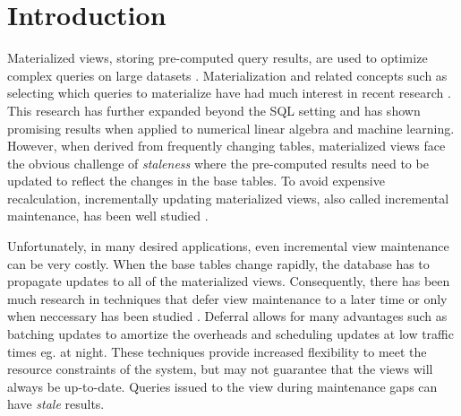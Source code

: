 \section{Introduction}
Materialized views, storing pre-computed query results, are used to optimize complex queries on large datasets \cite{gupta1995maintenance, chirkova2011materialized, halevy2001answering}. 
Materialization and related concepts such as selecting which queries to materialize
have had much interest in recent research \cite{zaharia2012resilient,lefevre2014opportunistic, bailis2014scalable, perez2014history}.
This research has further expanded beyond the SQL setting \cite{nikolic2014linview} and 
has shown promising results when applied to numerical linear algebra and machine learning.
However, when derived from frequently changing tables,
materialized views face the obvious challenge of \emph{staleness} where the pre-computed results need to be updated to reflect the changes in the base tables.
To avoid expensive recalculation, incrementally updating materialized views,
also called incremental maintenance, has been well studied \cite{gupta1995maintenance, chirkova2011materialized}.

Unfortunately, in many desired applications, even incremental view maintenance can be very costly. 
When the base tables change rapidly, the database has to propagate updates to all of the materialized views.
Consequently, there has been much research in techniques that defer view maintenance to a later time or only when neccessary has been studied \cite{chirkova2011materialized, zhou2007lazy}.
Deferral allows for many advantages such as batching updates to amortize the overheads and scheduling updates at low traffic times eg. at night.
These techniques provide increased flexibility to meet the resource constraints of the system, but may not guarantee that the views will always be up-to-date.
Queries issued to the view during maintenance gaps can have \emph{stale} results. 

